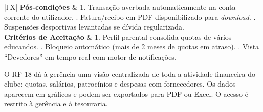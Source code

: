{\begin{xltabular}{\textwidth}{|l|X|}
\textbf{Pós-condições} & 1. Transação averbada automaticamente na conta corrente do utilizador. . Fatura/recibo em PDF disponibilizado para \textit{download}. . Suspensões desportivas levantadas se dívida regularizada. \\ \hline
\textbf{Critérios de Aceitação} & 1. Perfil parental consolida quotas de vários educandos. . Bloqueio automático (mais de 2 meses de quotas em atraso). . Vista ``Devedores'' em tempo real com motor de notificações. \\
\end{xltabular}
}


O RF-18 dá à gerência uma visão centralizada de toda a atividade financeira do clube: quotas, salários, patrocínios e despesas com fornecedores. Os dados aparecem em gráficos e podem ser exportados para PDF ou Excel. O acesso é restrito à gerência e à tesouraria.

